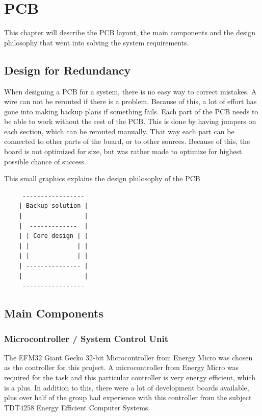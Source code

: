 \documentclass[../main/report.tex]{subfiles}
\begin{document}
\chapter{PCB}
\label{sec:pcb}

This chapter will describe the PCB layout, the main components and the design philosophy that went into solving the system requirements.


\section{Design for Redundancy}

When designing a PCB for a system, there is no easy way to correct mistakes.
A wire can not be rerouted if there is a problem.
Because of this, a lot of effort has gone into making backup plans if something fails.
Each part of the PCB needs to be able to work without the rest of the PCB.
This is done by having jumpers on each section, which can be rerouted manually.
That way each part can be connected to other parts of the board, or to other sources.
Because of this, the board is not optimized for size, but was rather made to optimize for highest possible chance of success.

This small graphics explains the design philosophy of the PCB
\begin{verbatim}
     -----------------
    | Backup solution |
    |                 |
    |  -------------  |
    | | Core design | |
    | |             | |
    | |             | |
    | --------------- |
    |                 |
     -----------------
\end{verbatim}

\section{Main Components}

\subsection{Microcontroller / System Control Unit}
The EFM32 Giant Gecko 32-bit Microcontroller from Energy Micro was chosen as the controller for this project.
A microcontroller from Energy Micro was required for the task and this particular controller is
very energy efficient, which is a plus.
In addition to this, there were a lot of development boards available,
plus over half of the group had experience with this controller from the subject
TDT4258 Energy Efficient Computer Systems.
\end{document}
